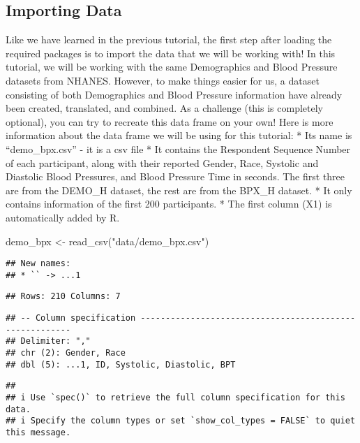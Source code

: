 \documentclass[
]{book}
\newenvironment{Shaded}{\begin{snugshade}}{\end{snugshade}}
\newcommand{\FunctionTok}[1]{\textcolor[rgb]{0.00,0.00,0.00}{#1}}
\newcommand{\NormalTok}[1]{#1}
\newcommand{\OtherTok}[1]{\textcolor[rgb]{0.56,0.35,0.01}{#1}}
\newcommand{\StringTok}[1]{\textcolor[rgb]{0.31,0.60,0.02}{#1}}
\begin{document}
\hypertarget{importing-data}{%
\subsection{Importing Data}\label{importing-data}}

Like we have learned in the previous tutorial, the first step after loading the required packages is to import the data that we will be working with! In this tutorial, we will be working with the same Demographics and Blood Pressure datasets from NHANES. However, to make things easier for us, a dataset consisting of both Demographics and Blood Pressure information have already been created, translated, and combined. As a challenge (this is completely optional), you can try to recreate this data frame on your own! Here is more information about the data frame we will be using for this tutorial:
* Its name is ``demo\_bpx.csv'' - it is a csv file
* It contains the Respondent Sequence Number of each participant, along with their reported Gender, Race, Systolic and Diastolic Blood Pressures, and Blood Pressure Time in seconds. The first three are from the DEMO\_H dataset, the rest are from the BPX\_H dataset.
* It only contains information of the first 200 participants.
* The first column (X1) is automatically added by R.

\begin{Shaded}
\begin{Highlighting}[]
\NormalTok{demo\_bpx }\OtherTok{\textless{}{-}} \FunctionTok{read\_csv}\NormalTok{(}\StringTok{"data/demo\_bpx.csv"}\NormalTok{)}
\end{Highlighting}
\end{Shaded}

\begin{verbatim}
## New names:
## * `` -> ...1
\end{verbatim}

\begin{verbatim}
## Rows: 210 Columns: 7
\end{verbatim}

\begin{verbatim}
## -- Column specification --------------------------------------------------------
## Delimiter: ","
## chr (2): Gender, Race
## dbl (5): ...1, ID, Systolic, Diastolic, BPT
\end{verbatim}

\begin{verbatim}
##
## i Use `spec()` to retrieve the full column specification for this data.
## i Specify the column types or set `show_col_types = FALSE` to quiet this message.
\end{verbatim}
\end{document}
